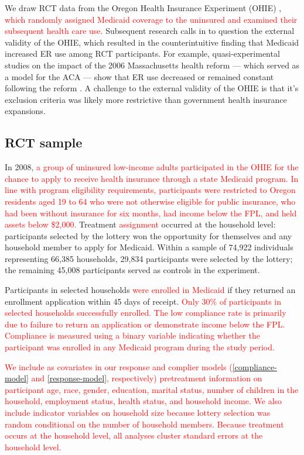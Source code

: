 \documentclass[hidelinks,12pt]{article}
\begin{document}
We draw RCT data from the Oregon Health Insurance Experiment (OHIE) \citep{finkelstein2012,Taubman}, \textcolor{red}{which randomly assigned Medicaid coverage to the uninsured and examined their subsequent health care use.} Subsequent research calls in to question the external validity of the OHIE, which resulted in the counterintuitive finding that Medicaid increased ER use among RCT participants. For example, quasi-experimental studies on the impact of the 2006 Massachusetts health reform --- which served as a model for the ACA --- show that ER use decreased or remained constant following the reform \citep{miller2012effect, kolstad2012impact}. A challenge to the external validity of the OHIE is that it's exclusion criteria was likely more restrictive than government health insurance expansions. 

\subsection{RCT sample} 

In 2008, \textcolor{red}{a group of uninsured low-income adults participated in the OHIE for the chance to apply to receive health insurance through a state Medicaid program. In line with program eligibility requirements, participants were restricted to Oregon residents aged 19 to 64 who were not otherwise eligible for public insurance, who had been without insurance for six months, had income below the FPL, and held assets below \$2,000.} Treatment \textcolor{red}{assignment} occurred at the household level: participants selected by the lottery won the opportunity for themselves and any household member to apply for Medicaid. Within a sample of 74,922 individuals representing 66,385 households, 29,834 participants were selected by the lottery; the remaining 45,008 participants served as controls in the experiment. 

Participants in selected households \textcolor{red}{were enrolled in Medicaid} if they returned an enrollment application within 45 days of receipt. \textcolor{red}{Only 30\% of participants in selected households successfully enrolled. The low compliance rate is primarily due to failure to return an application or demonstrate income below the FPL. Compliance is measured using a binary variable indicating whether the participant was enrolled in any Medicaid program during the study period.}

\textcolor{red}{We include as covariates in our response and complier models (\ref{compliance-model} and \ref{response-model}, respectively) pretreatment information on participant age, race, gender, education, marital status, number of children in the household, employment status, health status, and household income. We also include indicator variables on household size because lottery selection was random conditional on the number of household members. Because treatment occurs at the household level, all analyses cluster standard errors at the household level.} 
\end{document}
